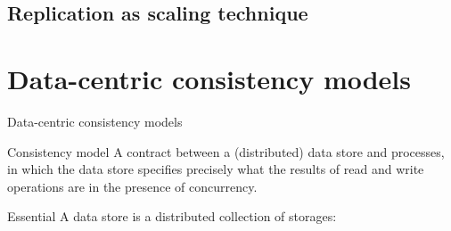 \subsection{Replication as scaling technique}
\section{Data-centric consistency models}
\begin{slide}{Data-centric consistency models}
  \begin{block}{Consistency model} 
    A contract between a (distributed) data store and processes, in which the data store specifies precisely
    what the results of read and write operations are in the presence of concurrency.
  \end{block}
  \begin{alertblock}{Essential}
    A data store is a distributed collection of storages:
    \begin{center}
    \end{center}
  \end{alertblock}
\end{slide}
